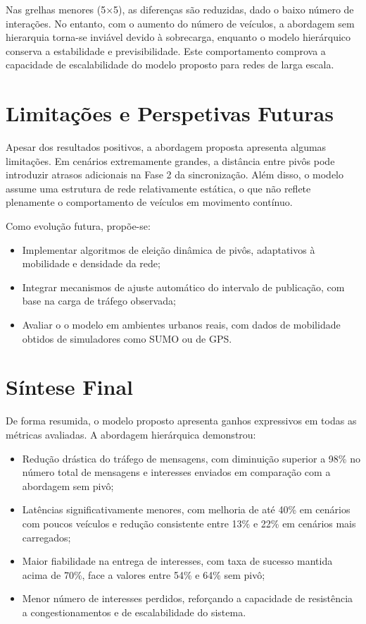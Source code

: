 Nas grelhas menores (5×5), as diferenças são reduzidas, dado o baixo número de interações. No entanto, com o aumento do número de veículos, a abordagem sem hierarquia torna-se inviável devido à sobrecarga, enquanto o modelo hierárquico conserva a estabilidade e previsibilidade.  
Este comportamento comprova a capacidade de escalabilidade do modelo proposto para redes de larga escala.

\section{Limitações e Perspetivas Futuras}

Apesar dos resultados positivos, a abordagem proposta apresenta algumas limitações.  
Em cenários extremamente grandes, a distância entre pivôs pode introduzir atrasos adicionais na Fase 2 da sincronização.  
Além disso, o modelo assume uma estrutura de rede relativamente estática, o que não reflete plenamente o comportamento de veículos em movimento contínuo.

Como evolução futura, propõe-se:
\begin{itemize}
    \item Implementar algoritmos de eleição dinâmica de pivôs, adaptativos à mobilidade e densidade da rede;
    \item Integrar mecanismos de ajuste automático do intervalo de publicação, com base na carga de tráfego observada;
    \item Avaliar o o modelo em ambientes urbanos reais, com dados de mobilidade obtidos de simuladores como SUMO ou de GPS.
\end{itemize}

\section{Síntese Final}

De forma resumida, o modelo proposto apresenta ganhos expressivos em todas as métricas avaliadas. A abordagem hierárquica demonstrou:

\begin{itemize}
    \item Redução drástica do tráfego de mensagens, com diminuição superior a 98\% no número total de mensagens e interesses enviados em comparação com a abordagem sem pivô;
    \item Latências significativamente menores, com melhoria de até 40\% em cenários com poucos veículos e redução consistente entre 13\% e 22\% em cenários mais carregados;
    \item Maior fiabilidade na entrega de interesses, com taxa de sucesso mantida acima de 70\%, face a valores entre 54\% e 64\% sem pivô;
    \item Menor número de interesses perdidos, reforçando a capacidade de resistência a congestionamentos e de escalabilidade do sistema.
\end{itemize}

